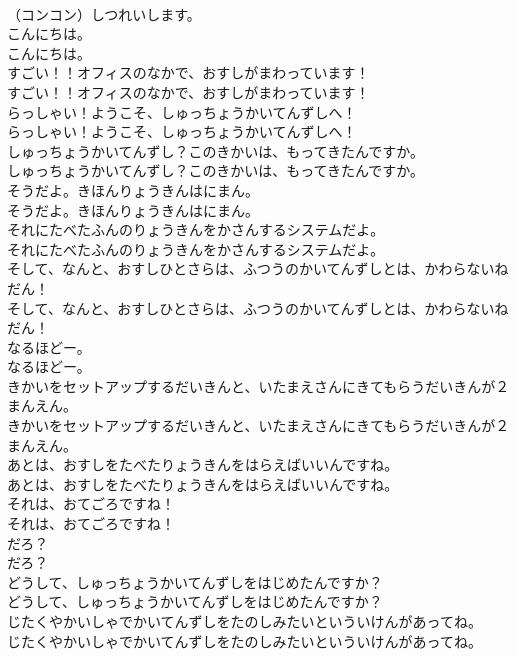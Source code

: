 \documentclass[8pt]{extreport}
\begin{document}
\begin{CJK}{UTF8}{min}
\\	（コンコン）しつれいします。 
\\	こんにちは。	
\\	こんにちは。 
\\	すごい！！オフィスのなかで、おすしがまわっています！	
\\	すごい！！オフィスのなかで、おすしがまわっています！ 
\\	らっしゃい！ようこそ、しゅっちょうかいてんずしへ！	
\\	らっしゃい！ようこそ、しゅっちょうかいてんずしへ！ 
\\	しゅっちょうかいてんずし？このきかいは、もってきたんですか。	
\\	しゅっちょうかいてんずし？このきかいは、もってきたんですか。 
\\	そうだよ。きほんりょうきんはにまん。	
\\	そうだよ。きほんりょうきんはにまん。 
\\	それにたべたふんのりょうきんをかさんするシステムだよ。	
\\	それにたべたふんのりょうきんをかさんするシステムだよ。 
\\	そして、なんと、おすしひとさらは、ふつうのかいてんずしとは、かわらないねだん！	
\\	そして、なんと、おすしひとさらは、ふつうのかいてんずしとは、かわらないねだん！ 
\\	なるほどー。	
\\	なるほどー。 
\\	きかいをセットアップするだいきんと、いたまえさんにきてもらうだいきんが２まんえん。	
\\	きかいをセットアップするだいきんと、いたまえさんにきてもらうだいきんが２まんえん。 
\\	あとは、おすしをたべたりょうきんをはらえばいいんですね。	
\\	あとは、おすしをたべたりょうきんをはらえばいいんですね。 
\\	それは、おてごろですね！	
\\	それは、おてごろですね！ 
\\	だろ？	
\\	だろ？ 
\\	どうして、しゅっちょうかいてんずしをはじめたんですか？	
\\	どうして、しゅっちょうかいてんずしをはじめたんですか？ 
\\	じたくやかいしゃでかいてんずしをたのしみたいといういけんがあってね。	
\\	じたくやかいしゃでかいてんずしをたのしみたいといういけんがあってね。 

\end{CJK}
\end{document}
